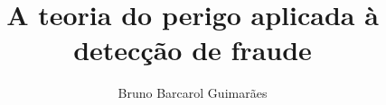 \documentclass{article}
\title{A teoria do perigo aplicada à detecção de fraude}
\author{Bruno Barcarol Guimarães}
\begin{document}
\maketitle
\newpage

\tableofcontents{}
\newpage
\end{document}
